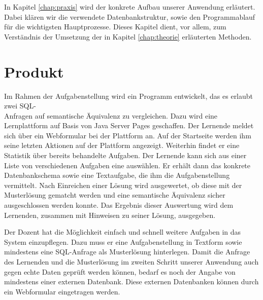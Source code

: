 In Kapitel \ref{chap:praxis} wird der konkrete Aufbau unserer Anwendung erläutert. Dabei klären wir die verwendete Datenbankstruktur, sowie den Programmablauf für die wichtigsten Hauptprozesse. Dieses Kapitel dient, vor allem, zum Verständnis der Umsetzung der in Kapitel \ref{chap:theorie} erläuterten Methoden.

\section{Produkt}

Im Rahmen der Aufgabenstellung wird ein Programm entwickelt, das es erlaubt zwei SQL-\\Anfragen auf semantische Äquivalenz zu vergleichen. Dazu wird eine Lernplattform auf Basis von Java Server Pages geschaffen. Der Lernende meldet sich über ein Webformular bei der Plattform an. Auf der Startseite werden ihm seine letzten Aktionen auf der Plattform angezeigt. Weiterhin findet er eine Statistik über bereits behandelte Aufgaben. Der Lernende kann sich aus einer Liste von verschiedenen Aufgaben eine auswählen. Er erhält dann das konkrete Datenbankschema sowie eine Textaufgabe, die ihm die Aufgabenstellung vermittelt. Nach Einreichen einer Lösung wird ausgewertet, ob diese mit der Musterlösung gematcht werden und eine semantische Äquivalenz sicher ausgeschlossen werden konnte. Das Ergebnis dieser Auswertung wird dem Lernenden, zusammen mit Hinweisen zu seiner Lösung, ausgegeben.

Der Dozent hat die Möglichkeit einfach und schnell weitere Aufgaben in das System einzupflegen. Dazu muss er eine Aufgabenstellung in Textform sowie mindestens eine SQL-Anfrage als Musterlösung hinterlegen. Damit die Anfrage des Lernenden und die Musterlösung im zweiten Schritt unserer Anwendung auch gegen echte Daten geprüft werden können, bedarf es noch der Angabe von mindestens einer externen Datenbank. Diese externen Datenbanken können durch ein Webformular eingetragen werden.

